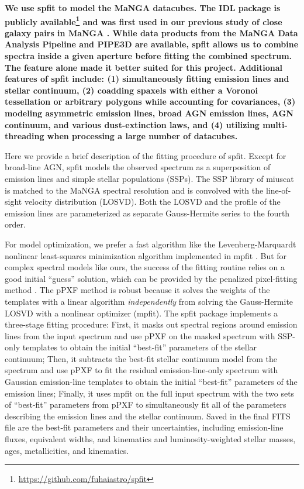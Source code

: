 \documentclass[iop,revtex4,twocolumn,apj,numberedappendix,appendixfloats]{emulateapj}
\begin{document}
{\bf 
We use {\sc spfit} to model the MaNGA datacubes. The IDL package is publicly available\footnote{\url{https://github.com/fuhaiastro/spfit}} and was first used in our previous study of close galaxy pairs in MaNGA . While data products from the MaNGA Data Analysis Pipeline \citep[DAP;][]{Belfiore:2019} and {\sc PIPE3D} \citep{Sanchez:2016a, Sanchez:2016b} are available, {\sc spfit} allows us to combine spectra inside a given aperture before fitting the combined spectrum. The feature alone made it better suited for this project. Additional features of {\sc spfit} include: (1) simultaneously fitting emission lines and stellar continuum, (2) coadding spaxels with either a Voronoi tessellation or arbitrary polygons while accounting for covariances, (3) modeling asymmetric emission lines, broad AGN emission lines, AGN continuum, and various dust-extinction laws, and (4) utilizing multi-threading when processing a large number of datacubes.

Here we provide a brief description of the fitting procedure of {\sc spfit}. Except for broad-line AGN, {\sc spfit} models the observed spectrum as a superposition of emission lines and simple stellar populations (SSPs). The SSP library of {\sc miuscat} \citep{Vazdekis:2012} is matched to the MaNGA spectral resolution and is convolved with the line-of-sight velocity distribution (LOSVD). Both the LOSVD and the profile of the emission lines are parameterized as separate Gauss-Hermite series \citep{van-der-Marel:1993} to the fourth order.

For model optimization, we prefer a fast algorithm like the Levenberg-Marquardt nonlinear least-squares minimization algorithm implemented in {\sc mpfit} \citep{Markwardt:2009}. But for complex spectral models like ours, the success of the fitting routine relies on a good initial ``guess'' solution, which can be provided by the penalized pixel-fitting method \citep[pPXF;][]{Cappellari:2017}. The pPXF method is robust because it solves the weights of the templates with a linear algorithm \citep{Lawson:1974} {\it independently} from solving the Gauss-Hermite LOSVD with a nonlinear optimizer ({\sc mpfit}). The {\sc spfit} package implements a three-stage fitting procedure: First, it masks out spectral regions around emission lines from the input spectrum and use pPXF on the masked spectrum with SSP-only templates to obtain the initial ``best-fit'' parameters of the stellar continuum; Then, it subtracts the best-fit stellar continuum model from the spectrum and use pPXF to fit the residual emission-line-only spectrum with Gaussian emission-line templates to obtain the initial ``best-fit'' parameters of the emission lines; Finally, it uses {\sc mpfit} on the full input spectrum with the two sets of ``best-fit'' parameters from pPXF to simultaneously fit all of the parameters describing the emission lines and the stellar continuum. Saved in the final FITS file are the best-fit parameters and their uncertainties, including emission-line fluxes, equivalent widths, and kinematics and luminosity-weighted stellar masses, ages, metallicities, and kinematics. 
}
\end{document}
